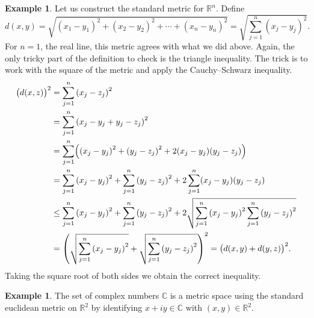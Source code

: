 \documentclass[12pt,openany]{book}
\newcommand{\C}{{\mathbb{C}}}
\newcommand{\R}{{\mathbb{R}}}
\theoremstyle{plain}
\theoremstyle{remark}
\theoremstyle{definition}
\theoremstyle{exercise}
\theoremstyle{example}
\newtheorem{example}[thm]{Example}
\begin{document}
\begin{example}
Let us construct the
standard metric\index{standard metric on $\R^n$} for $\R^n$.  Define
\begin{equation*}
d(x,y) =
\sqrt{
{(x_1-y_1)}^2 + 
{(x_2-y_2)}^2 + 
\cdots +
{(x_n-y_n)}^2
} =
\sqrt{
\sum_{j=1}^n
{(x_j-y_j)}^2 
} .
\end{equation*}
For $n=1$, the real line, this metric agrees with what we did above.  Again,
the only tricky part of the definition to check is the triangle inequality.
The trick is to work with 
the square of the metric and apply
the Cauchy--Schwarz inequality.
\begin{equation*}
\begin{split}
{\bigl(d(x,z)\bigr)}^2 & =
\sum_{j=1}^n
{(x_j-z_j)}^2 
\\
& =
\sum_{j=1}^n
{(x_j-y_j+y_j-z_j)}^2 
\\
& =
\sum_{j=1}^n
\Bigl(
{(x_j-y_j)}^2+{(y_j-z_j)}^2 + 2(x_j-y_j)(y_j-z_j)
\Bigr)
\\
& =
\sum_{j=1}^n
{(x_j-y_j)}^2
+
\sum_{j=1}^n
{(y_j-z_j)}^2 
+
2
\sum_{j=1}^n
(x_j-y_j)(y_j-z_j)
\\
& \leq
\sum_{j=1}^n
{(x_j-y_j)}^2
+
\sum_{j=1}^n
{(y_j-z_j)}^2 
+
2
\sqrt{
\sum_{j=1}^n
{(x_j-y_j)}^2
\sum_{j=1}^n
{(y_j-z_j)}^2
}
\\
& =
{\left(
\sqrt{
\sum_{j=1}^n
{(x_j-y_j)}^2
}
+
\sqrt{
\sum_{j=1}^n
{(y_j-z_j)}^2 
}
\right)}^2
=
{\bigl( d(x,y) + d(y,z) \bigr)}^2 .
\end{split}
\end{equation*}
Taking the square root of both sides we obtain the correct inequality.
\end{example}

\begin{example} \label{example:mscomplex}
The set of complex numbers $\C$ is a metric space using the standard
euclidean metric on $\R^2$
by identifying $x+iy \in \C$ with $(x,y) \in \R^2$.
\end{example}
\end{document}
